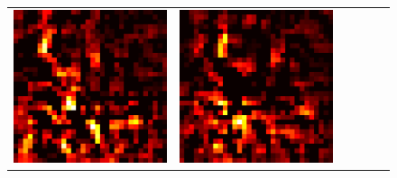 \documentclass[preprint,12pt]{elsarticle}
\begin{document}
\begin{figure}[p]
\begin{tabular}{cccccc}
  \includegraphics[scale=\scale]{../visualizations/examples/cifar10/cnn/active_saliency_map/8.png} & 
  \includegraphics[scale=\scale]{../visualizations/examples/cifar10/cnn/inactive_saliency_map/8.png} \\
  

\end{tabular}
\end{figure}
\end{document}
